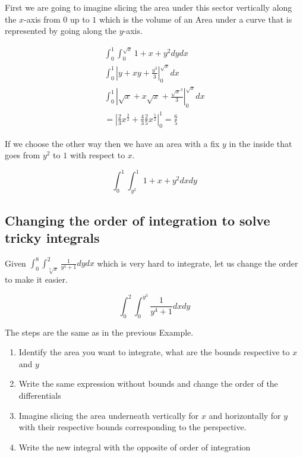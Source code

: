 First we are going to imagine slicing the area under this sector vertically along the \(x\)-axis from \(0\) up to \(1\) which
is the volume of an Area under a curve that is represented by going along the \(y\)-axis.

\begin{align*}
    \int_{0}^{1}\int_{0}^{\sqrt{x}} 1 + x + y^2 dy dx \\
    \int_{0}^{1} \left| y + xy + \frac{y^3}{3} \right|_{0}^{\sqrt{x}} dx \\
    \int_{0}^{1} \left| \sqrt{x} + x\sqrt{x} + \frac{\sqrt{x}^3}{3} \right|_{0}^{\sqrt{x}} dx \\
    = \left| \frac{2}{3} x^{\frac{3}{2}} + \frac{4}{3} \frac{2}{5} x^{\frac{5}{2}} \right|_{0}^{1} = \frac{6}{5}
\end{align*}

If we choose the other way then we have an area with a fix \(y\) in the inside that goes from \(y^2\) to \(1\) with respect to \(x\).

\[
    \int_{0}^{1}\int_{y^2}^{1} 1 + x + y^2 dx dy
\]

\subsection{Changing the order of integration to solve tricky integrals}

Given \(\int_{0}^{8}\int_{\sqrt[3]{x}}^{2} \frac{1}{y^4 +1}dy dx\) which is very hard to integrate, let us change the order
to make it easier.

\[
    \int_{0}^{2}\int_{0}^{y^3} \frac{1}{y^4 +1}dx dy
\]

The steps are the same as in the previous Example.

\begin{enumerate}

    \item Identify the area you want to integrate, what are the bounds respective to \(x\) and \(y\)

    \item Write the same expression without bounds and change the order of the differentials


    \item Imagine slicing the area underneath vertically for \(x\) and horizontally for \(y\) with their respective bounds corresponding
    to the perspective.

    \item Write the new integral with the opposite of order of integration

\end{enumerate}

